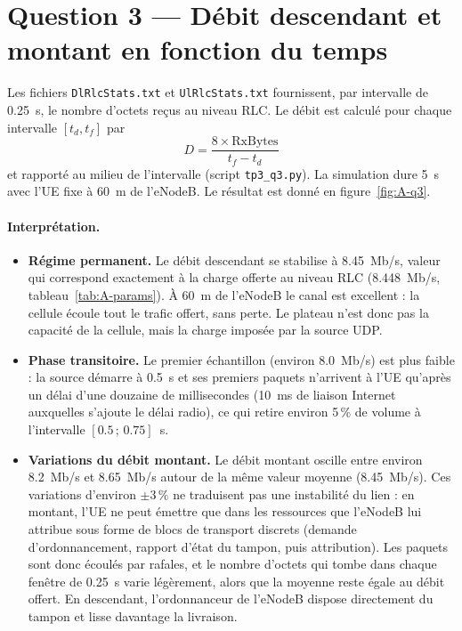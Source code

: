\section{Question 3 --- Débit descendant et montant en fonction du temps}

Les fichiers \texttt{DlRlcStats.txt} et \texttt{UlRlcStats.txt} fournissent,
par intervalle de \SI{0.25}{s}, le nombre d'octets reçus au niveau RLC. Le débit
est calculé pour chaque intervalle $[t_{d}, t_{f}]$ par
\[
  D = \frac{8 \times \text{RxBytes}}{t_{f}-t_{d}}
\]
et rapporté au milieu de l'intervalle (script \texttt{tp3\_q3.py}). La
simulation dure \SI{5}{s} avec l'UE fixe à \SI{60}{m} de l'eNodeB. Le résultat
est donné en figure~\ref{fig:A-q3}.


\paragraph{Interprétation.}
\begin{itemize}[nosep]
\item \textbf{Régime permanent.} Le débit descendant se stabilise à
\SI{8.45}{Mb/s}, valeur qui correspond exactement à la charge offerte au niveau
RLC (\SI{8.448}{Mb/s}, tableau~\ref{tab:A-params}). À \SI{60}{m} de l'eNodeB le
canal est excellent : la cellule écoule tout le trafic offert, sans perte. Le
plateau n'est donc pas la capacité de la cellule, mais la charge imposée par la
source UDP.
\item \textbf{Phase transitoire.} Le premier échantillon (environ
\SI{8.0}{Mb/s}) est plus faible : la source démarre à \SI{0.5}{s} et ses
premiers paquets n'arrivent à l'UE qu'après un délai d'une douzaine de
millisecondes (\SI{10}{ms} de liaison Internet auxquelles s'ajoute le délai
radio), ce qui retire environ 5\,\% de volume à l'intervalle
$[0.5\,;\,0.75]$~s.
\item \textbf{Variations du débit montant.} Le débit montant oscille entre
environ \SI{8.2}{Mb/s} et \SI{8.65}{Mb/s} autour de la même valeur moyenne
(\SI{8.45}{Mb/s}). Ces variations d'environ $\pm 3\,\%$ ne traduisent pas une
instabilité du lien : en montant, l'UE ne peut émettre que dans les ressources
que l'eNodeB lui attribue sous forme de blocs de transport discrets (demande
d'ordonnancement, rapport d'état du tampon, puis attribution). Les paquets
sont donc écoulés par rafales, et le nombre d'octets qui tombe dans chaque
fenêtre de \SI{0.25}{s} varie légèrement, alors que la moyenne reste égale au
débit offert. En descendant, l'ordonnanceur de l'eNodeB dispose directement du
tampon et lisse davantage la livraison.
\end{itemize}

